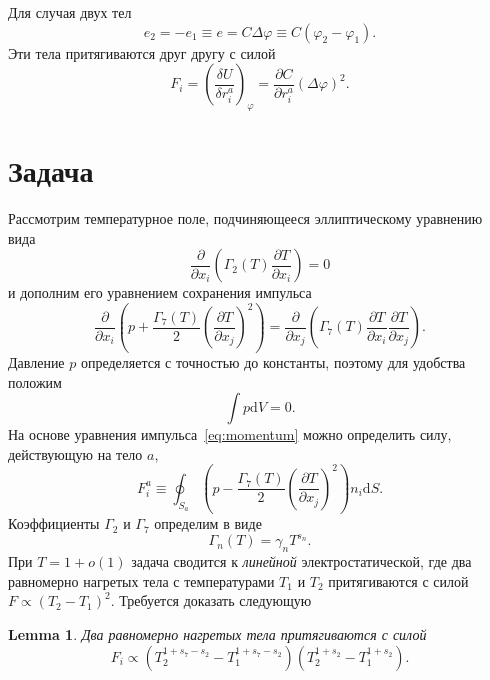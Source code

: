 \documentclass{article}
\theoremstyle{plain}
\newtheorem*{lemma}{Lemma}
\newcommand{\dd}{\mathrm{d}}
\newcommand{\pder}[2][]{\frac{\partial#1}{\partial#2}}
\newcommand{\eqdef}{\equiv}
\begin{document}
Для случая двух тел
\begin{equation}\label{eq:capacity}
    e_2 = -e_1 \eqdef e = C\Delta\varphi \eqdef C(\varphi_2 - \varphi_1).
\end{equation}
Эти тела притягиваются друг другу с силой
\begin{equation}\label{eq:force2}
    F_i = \left(\frac{\delta U}{\delta r^a_i}\right)_\varphi = \pder[C]{r^a_i}(\Delta\varphi)^2.
\end{equation}

\section{Задача}

Рассмотрим температурное поле, подчиняющееся эллиптическому уравнению вида
\begin{equation}\label{eq:elliptic}
    \pder{x_i}\left( \Gamma_2(T) \pder[T]{x_i} \right) = 0
\end{equation}
и дополним его уравнением сохранения импульса
\begin{equation}\label{eq:momentum}
    \pder{x_i}\left( p + \frac{\Gamma_7(T)}{2}\left(\pder[T]{x_j}\right)^2 \right) =
    \pder{x_j}\left( \Gamma_7(T)\pder[T]{x_i}\pder[T]{x_j} \right).
\end{equation}
Давление \(p\) определяется с точностью до константы, поэтому для удобства положим
\begin{equation}\label{eq:pressure}
    \int p\dd{V} = 0.
\end{equation}
На основе уравнения импульса~\eqref{eq:momentum} можно определить силу, действующую на тело \(a\),
\begin{equation}\label{eq:force_ell}
    F^a_i \eqdef \oint_{S_a} \left( p - \frac{\Gamma_7(T)}{2}\left(\pder[T]{x_j}\right)^2 \right) n_i\dd{S}.
\end{equation}
Коэффициенты \(\Gamma_2\) и \(\Gamma_7\) определим в виде
\begin{equation}\label{eq:gammas}
    \Gamma_n(T) = \gamma_n T^{s_n}.
\end{equation}
При \(T=1+o(1)\) задача сводится к \emph{линейной} электростатической,
где два равномерно нагретых тела с температурами \(T_1\) и \(T_2\) притягиваются с силой \(F \propto (T_2-T_1)^2\).
Требуется доказать следующую
\begin{lemma}\label{lem:force}
    Два равномерно нагретых тела притягиваются с силой
    \begin{equation}\label{eq:force_temp}
        F_i \propto \left( T_2^{1+s_7-s_2} - T_1^{1+s_7-s_2} \right)\left( T_2^{1+s_2} - T_1^{1+s_2} \right).
    \end{equation}
\end{lemma}
\end{document}
